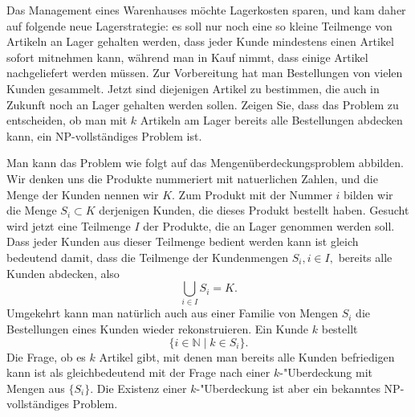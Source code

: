 Das Management eines Warenhauses möchte Lagerkosten sparen, und
kam daher auf folgende neue Lagerstrategie: es soll nur noch eine
so kleine Teilmenge von Artikeln an Lager gehalten werden, dass
jeder Kunde mindestens einen Artikel sofort mitnehmen kann, während
man in Kauf nimmt, dass einige Artikel nachgeliefert werden müssen.
Zur Vorbereitung hat man Bestellungen von vielen Kunden gesammelt.
Jetzt sind diejenigen Artikel zu bestimmen, die auch in Zukunft
noch an Lager gehalten werden sollen. Zeigen Sie, dass das Problem
zu entscheiden, ob man mit $k$ Artikeln am Lager bereits alle
Bestellungen abdecken kann, ein NP-vollständiges Problem ist.


\begin{loesung}
Man kann das Problem wie folgt auf das Mengenüberdeckungsproblem
abbilden.
Wir denken uns die Produkte nummeriert mit natuerlichen Zahlen,
und die Menge der Kunden nennen wir $K$.
Zum Produkt mit der Nummer $i$ bilden wir die Menge
$S_i\subset K$ derjenigen Kunden, die dieses Produkt bestellt haben.
Gesucht wird jetzt eine Teilmenge $I$ der Produkte, die an Lager
genommen werden soll. Dass jeder Kunden aus dieser Teilmenge
bedient werden kann ist gleich bedeutend damit, dass die Teilmenge
der Kundenmengen $S_i, i\in I,$ bereits alle Kunden abdecken, also
\[
\bigcup_{i\in I}S_i=K.
\]
Umgekehrt kann man natürlich auch aus einer Familie von Mengen
$S_i$ die Bestellungen eines Kunden wieder rekonstruieren. Ein
Kunde $k$ bestellt
\[
\{i\in \mathbb N\;|\;k\in S_i\}.
\]
Die Frage, ob es $k$ Artikel gibt, mit denen man bereits alle
Kunden befriedigen kann ist als gleichbedeutend mit der Frage
nach einer $k$-"Uberdeckung mit Mengen aus $\{S_i\}$. Die
Existenz einer $k$-"Uberdeckung ist aber ein bekanntes NP-vollständiges
Problem.
\end{loesung}
